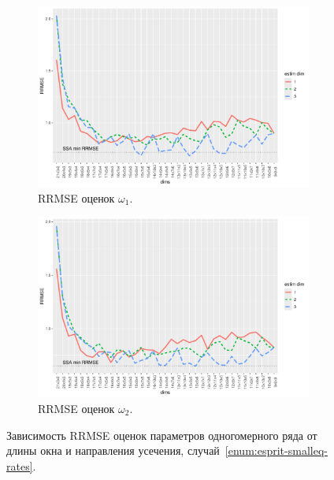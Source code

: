 \documentclass[specialist,
  substylefile=spbu_report.rtx,
subf,href,colorlinks=true, 12pt]{disser}
\theoremstyle{plain}
\theoremstyle{definition}
\theoremstyle{remark}
\begin{document}
\begin{figure}[!ht]
\begin{subfigure}{0.49\linewidth}
    \includegraphics[width=\linewidth, height=0.167\textheight]{freq1_dims_small_eq_rates.pdf}
    \caption{RRMSE оценок $\omega_1$.}
    \label{fig:freq1_dims_small_eq_rates}
  \end{subfigure}
  \begin{subfigure}{0.49\linewidth}
    \includegraphics[width=\linewidth, height=0.167\textheight]{freq2_dims_small_eq_rates.pdf}
    \caption{RRMSE оценок $\omega_2$.}
    \label{fig:freq2_dims_small_eq_rates}
  \end{subfigure}
  \caption{Зависимость RRMSE оценок параметров одногомерного ряда
    от длины окна и направления усечения,
  случай~\ref{enum:esprit-smalleq-rates}.}
  \label{fig:dims_small_eq_rates}
\end{figure}
\end{document}
